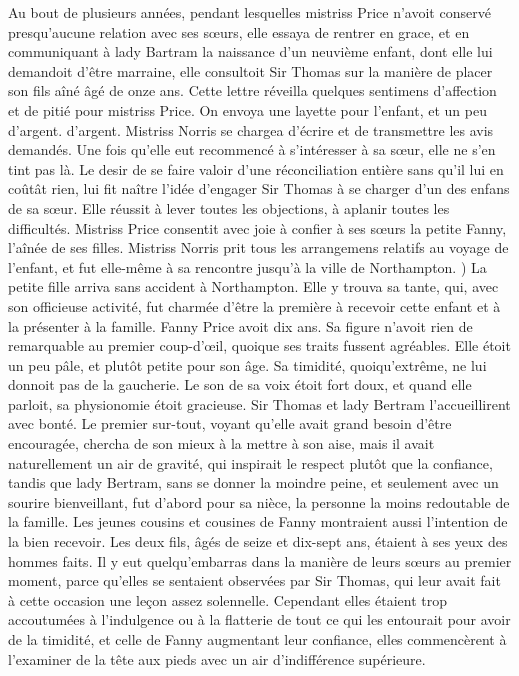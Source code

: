 Au bout de plusieurs années, pendant lesquelles mistriss Price n'avoit conservé presqu'aucune relation avec ses sœurs, elle essaya de rentrer en grace, et en communiquant à lady Bartram la naissance d'un neuvième enfant, dont elle lui demandoit d'être marraine, elle consultoit Sir Thomas sur la manière de placer son fils aîné âgé de onze ans. Cette lettre réveilla quelques sentimens d'affection et de pitié pour mistriss Price. On envoya une layette pour l'enfant, et un peu d'argent.\setcounter{page}{493} d'argent. Mistriss Norris se chargea d'écrire et de transmettre les avis demandés. Une fois qu'elle eut recommencé à s'intéresser à sa sœur, elle ne s'en tint pas là. Le desir de se faire valoir d'une réconciliation entière sans qu'il lui en coûtât rien, lui fit naître l'idée d'engager Sir Thomas à se charger d'un des enfans de sa sœur. Elle réussit à lever toutes les objections, à aplanir toutes les difficultés. Mistriss Price consentit avec joie à confier à ses sœurs la petite Fanny, l'aînée de ses filles. Mistriss Norris prit tous les arrangemens relatifs au voyage de l'enfant, et fut elle-même à sa rencontre jusqu'à la ville de Northampton. )
La petite fille arriva sans accident à Northampton. Elle y trouva sa tante, qui, avec son officieuse activité, fut charmée d'être la première à recevoir cette enfant et à la présenter à la famille.
Fanny Price avoit dix ans. Sa figure n'avoit rien de remarquable au premier coup-d'œil, quoique ses traits fussent agréables. Elle étoit un peu pâle, et plutôt petite pour son âge. Sa timidité, quoiqu'extrême, ne lui donnoit pas de la gaucherie. Le son de sa voix étoit fort doux, et quand elle parloit, sa physionomie étoit gracieuse.\setcounter{page}{494} Sir Thomas et lady Bertram l'accueillirent avec bonté. Le premier sur-tout, voyant qu'elle avait grand besoin d'être encouragée, chercha de son mieux à la mettre à son aise, mais il avait naturellement un air de gravité, qui inspirait le respect plutôt que la confiance, tandis que lady Bertram, sans se donner la moindre peine, et seulement avec un sourire bienveillant, fut d'abord pour sa nièce, la personne la moins redoutable de la famille.
Les jeunes cousins et cousines de Fanny montraient aussi l'intention de la bien recevoir. Les deux fils, âgés de seize et dix-sept ans, étaient à ses yeux des hommes faits. Il y eut quelqu'embarras dans la manière de leurs sœurs au premier moment, parce qu'elles se sentaient observées par Sir Thomas, qui leur avait fait à cette occasion une leçon assez solennelle. Cependant elles étaient trop accoutumées à l'indulgence ou à la flatterie de tout ce qui les entourait pour avoir de la timidité, et celle de Fanny augmentant leur confiance, elles commencèrent à l'examiner de la tête aux pieds avec un air d'indifférence supérieure.
